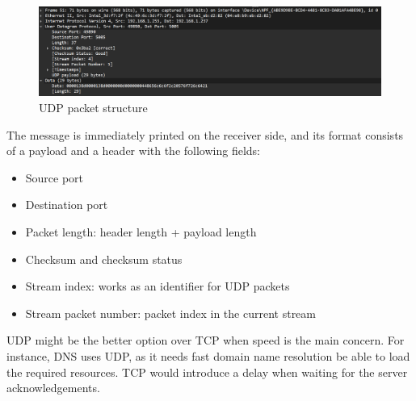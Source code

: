 \begin{figure}[htbp]
	\centering
	\includegraphics[width=1\linewidth]{img/second_exp/8.png}
	\caption{UDP packet structure}\label{fig:2_8}
\end{figure}

The message is immediately printed on the receiver side, and its format
consists of a payload and a header with the following fields:

\begin{itemize}
	\item Source port
	\item Destination port
	\item Packet length: header length + payload length
	\item Checksum and checksum status
	\item Stream index: works as an identifier for UDP packets
	\item Stream packet number: packet index in the current stream
\end{itemize}

UDP might be the better option over TCP when speed is the main concern. For
instance, DNS uses UDP, as it needs fast domain name resolution be able to load
the required resources. TCP would introduce a delay when waiting for the server
acknowledgements.